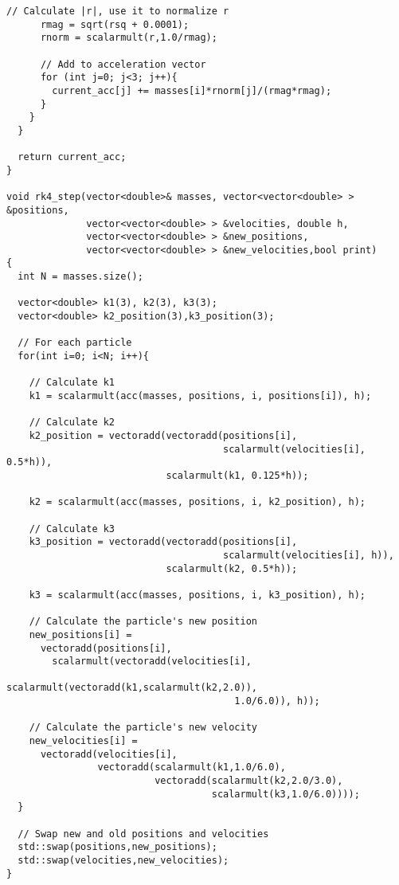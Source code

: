 \documentclass{article}
\begin{document}
\begin{lstlisting}[style=CStyle,firstnumber=1]
      // Calculate |r|, use it to normalize r
      rmag = sqrt(rsq + 0.0001);
      rnorm = scalarmult(r,1.0/rmag);

      // Add to acceleration vector
      for (int j=0; j<3; j++){
        current_acc[j] += masses[i]*rnorm[j]/(rmag*rmag);
      }
    }
  }

  return current_acc;
}

void rk4_step(vector<double>& masses, vector<vector<double> > &positions,
              vector<vector<double> > &velocities, double h,
              vector<vector<double> > &new_positions,
              vector<vector<double> > &new_velocities,bool print)
{
  int N = masses.size();

  vector<double> k1(3), k2(3), k3(3);
  vector<double> k2_position(3),k3_position(3);

  // For each particle
  for(int i=0; i<N; i++){

    // Calculate k1
    k1 = scalarmult(acc(masses, positions, i, positions[i]), h);

    // Calculate k2
    k2_position = vectoradd(vectoradd(positions[i], 
                                      scalarmult(velocities[i], 0.5*h)),
                            scalarmult(k1, 0.125*h));
    
    k2 = scalarmult(acc(masses, positions, i, k2_position), h);

    // Calculate k3
    k3_position = vectoradd(vectoradd(positions[i],
                                      scalarmult(velocities[i], h)),
                            scalarmult(k2, 0.5*h));
   
    k3 = scalarmult(acc(masses, positions, i, k3_position), h);

    // Calculate the particle's new position
    new_positions[i] = 
      vectoradd(positions[i],
        scalarmult(vectoradd(velocities[i],
                             scalarmult(vectoradd(k1,scalarmult(k2,2.0)),
                                        1.0/6.0)), h));

    // Calculate the particle's new velocity
    new_velocities[i] = 
      vectoradd(velocities[i],
                vectoradd(scalarmult(k1,1.0/6.0),
                          vectoradd(scalarmult(k2,2.0/3.0),
                                    scalarmult(k3,1.0/6.0))));
  }

  // Swap new and old positions and velocities
  std::swap(positions,new_positions);
  std::swap(velocities,new_velocities);
}




\end{lstlisting}
\end{document}

